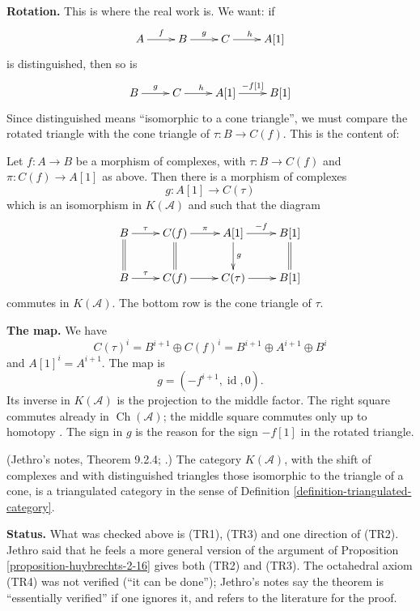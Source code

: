 \medskip\noindent
{\bf Rotation.} This is where the real
work is. We want: if
$$
\xymatrix{
A\ar[r]^{f}
&B\ar[r]^{g}
&C\ar[r]^{h}
&A[1]
}
$$
is distinguished, then so is
$$
\xymatrix{
B\ar[r]^{g}
&C\ar[r]^{h}
&A[1]\ar[r]^-{-f[1]}
&B[1]
}
$$
Since distinguished means ``isomorphic
to a cone triangle'', we must compare
the rotated triangle with the cone
triangle of $\tau:B\to C(f)$. This is
the content of:

\begin{proposition}
\label{proposition-huybrechts-2-16}
\cite[Proposition 2.16]{huybrechts-fm}
Let $f:A\to B$ be a morphism of
complexes, with $\tau:B\to C(f)$ and
$\pi:C(f)\to A[1]$ as above. Then there
is a morphism of complexes
$$
g:A[1]\to C(\tau)
$$
which is an isomorphism in
$K(\mathcal{A})$ and such that the
diagram
$$
\xymatrix{
B\ar[r]^-{\tau}\ar@{=}[d]
&C(f)\ar[r]^-{\pi}\ar@{=}[d]
&A[1]\ar[r]^-{-f}\ar[d]^{g}
&B[1]\ar@{=}[d]\\
B\ar[r]^-{\tau}
&C(f)\ar[r]
&C(\tau)\ar[r]
&B[1]
}
$$
commutes in $K(\mathcal{A})$. The bottom
row is the cone triangle of $\tau$.
\end{proposition}

\noindent
{\bf The map.} We have
$$
C(\tau)^i
=B^{i+1}\oplus C(f)^i
=B^{i+1}\oplus A^{i+1}\oplus B^i
$$
and $A[1]^i=A^{i+1}$. The map is
$$
g=(-f^{i+1},\operatorname{id},0).
$$
Its inverse in $K(\mathcal{A})$ is the
projection to the middle factor. The
right square commutes already in
$\operatorname{Ch}(\mathcal{A})$; the
middle square commutes only up to
homotopy \cite[proof of Proposition
2.16]{huybrechts-fm}. The sign in $g$ is
the reason for the sign $-f[1]$ in the
rotated triangle.

\begin{theorem}
\label{theorem-homotopy-category-triangulated}
(Jethro's notes, Theorem 9.2.4;
\cite[Proposition 2.24]{huybrechts-fm}.)
The category $K(\mathcal{A})$, with the
shift of complexes and with
distinguished triangles those isomorphic
to the triangle of a cone, is a
triangulated category in the sense of
Definition
\ref{definition-triangulated-category}.
\end{theorem}

\noindent
{\bf Status.} What was checked above is
(TR1), (TR3) and one direction of (TR2).
Jethro said that he feels a more general
version of the argument of Proposition
\ref{proposition-huybrechts-2-16} gives
both (TR2) and (TR3). The octahedral
axiom (TR4) was not verified (``it can
be done''); Jethro's notes say the
theorem is ``essentially verified'' if
one ignores it, and \cite{huybrechts-fm}
refers to the literature for the proof.

